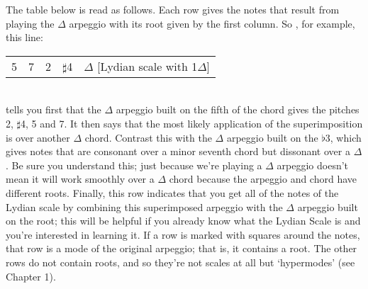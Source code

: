 \documentclass[english]{./gbook}
\begin{document}
\begin{large}
The table below is read as follows. Each row gives the notes that result from playing the $\Delta$ arpeggio with its root given by the first column. So , for example, this line:\\
\begin{tabular}{lllll}
5	&    7	&   2	&   $\sharp$4   &  $\Delta$ [Lydian scale with 1$\Delta$]        
\end{tabular}\\
tells you first that the $\Delta$ arpeggio built on the fifth of the chord gives the pitches 2, $\sharp$4, 5 and 7. It then says that the most likely application of the superimposition is over another $\Delta$ chord. Contrast this with the $\Delta$ arpeggio built on the $\flat$3, which gives notes that are consonant over a minor seventh chord but dissonant over a $\Delta$. Be sure you understand this; just because we're playing a $\Delta$ arpeggio doesn't mean it will work smoothly over a $\Delta$ chord because the arpeggio and chord have different roots. Finally, this row indicates that you get all of the notes of the Lydian scale by combining this superimposed arpeggio with the $\Delta$ arpeggio built on the root; this will be helpful if you already know what the Lydian Scale is and you're interested in learning it. If a row is marked with squares around the notes, that row is a mode of the original arpeggio; that is, it contains a root. The other rows do not contain roots, and so they're not scales at all but `hypermodes' (see Chapter 1).


\end{large}
\end{document}
